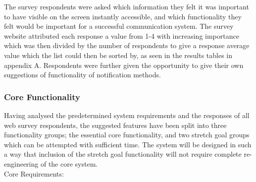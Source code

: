 The survey respondents were asked which information they felt it was important to have visible on the screen instantly accessible, and which functionality they felt would be important for a successful communication system.  The survey website attributed each response a value from 1-4 with increasing importance which was then divided by the number of respondents to give a response average value which the list could then be sorted by, as seen in the results tables in appendix A.  Respondents were further given the opportunity to give their own suggestions of functionality of notification methods.

\subsubsection{Core Functionality}

Having analysed the predetermined system requirements and the responses of all web survey respondents, the suggested features have been split into three functionality groups; the essential core functionality, and two stretch goal groups which can be attempted with sufficient time.  The system will be designed in such a way that inclusion of the stretch goal functionality will not require complete re-engineering of the core system.\\

Core Requirements:

